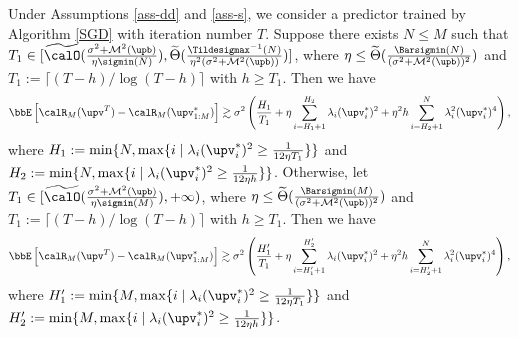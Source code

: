 \begin{theorem} \label{theorem-lower-bound}
    Under Assumptions \ref{ass-dd} and \ref{ass-s}, we consider a predictor trained by Algorithm \ref{SGD} with iteration number $T$. Suppose there exists $N\leq M$ such that $T_1\in[\widetilde{\calO}(\frac{\sigma^2+\mathcal{M}^2(\upb)}{\eta\sigmin(N)}),\widetilde{\Theta}(\frac{\Tildesigmax^{-1}(N)}{\eta^2(\sigma^2+\mathcal{M}^2(\upb))})]$, where $\eta\leq\widetilde{\Theta}(\frac{\Barsigmin(N)}{(\sigma^2+\mathcal{M}^2(\upb))^2})$ and $T_1:=\lceil(T-h)/\log(T-h)\rceil$ with $h\geq T_1$. Then we have
    \begin{align}
    \bbE\left[\calR_M(\upv^{T})-\calR_M(\upv_{1:M}^*)\right]\gtrsim\sigma^2\left(\frac{H_1}{T_1}+\eta\sum_{i=H_1+1}^{H_2}\lambda_i(\upv_i^*)^2+\eta^2h\sum_{i=H_2+1}^{N}\lambda_i^2(\upv_i^*)^4\right),\notag
\end{align}
where $H_1:=\min\{N,\max\{i\mid\lambda_i(\upv_i^*)^2\geq\frac{1}{12\eta T_1}\}\}$ and $H_2:=\min\{N,\max\{i\mid\lambda_i(\upv_i^*)^2\geq\frac{1}{12\eta h}\}\}$. Otherwise, let $T_1\in[\widetilde{\calO}(\frac{\sigma^2+\mathcal{M}^2(\upb)}{\eta\sigmin(M)}),+\infty)$, where $\eta\leq\widetilde{\Theta}(\frac{\Barsigmin(M)}{(\sigma^2+\mathcal{M}^2(\upb))^2})$ and $T_1:=\lceil(T-h)/\log(T-h)\rceil$ with $h\geq T_1$. Then we have
    \begin{align}
    \bbE\left[\calR_M(\upv^{T})-\calR_M(\upv_{1:M}^*)\right]\gtrsim\sigma^2\left(\frac{H_1'}{T_1}+\eta\sum_{i=H_1'+1}^{H_2'}\lambda_i(\upv_i^*)^2+\eta^2h\sum_{i=H_2'+1}^{N}\lambda_i^2(\upv_i^*)^4\right),\notag
\end{align}
where $H_1':=\min\{M,\max\{i\mid\lambda_i(\upv_i^*)^2\geq\frac{1}{12\eta T_1}\}\}$ and $H_2':=\min\{M,\max\{i\mid\lambda_i(\upv_i^*)^2\geq\frac{1}{12\eta h}\}\}$.
\end{theorem}

